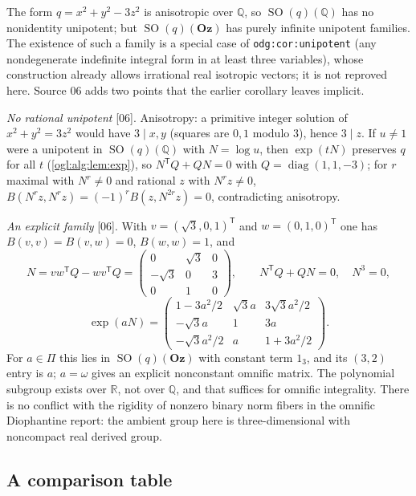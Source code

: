\documentclass[11pt,oneside]{article}
\numberwithin{equation}{section}
\theoremstyle{definition}
\theoremstyle{remark}
\newcommand{\Oz}{\mathbf{Oz}}
\newcommand{\Q}{\mathbb Q}
\newcommand{\R}{\mathbb R}
\newcommand{\SO}{\operatorname{SO}}
\newcommand{\diag}{\operatorname{diag}}
\newcommand{\src}[1]{\textup{\textsf{\small[#1]}}}
\newcommand{\replabel}[1]{\nolinkurl{#1}}
\begin{document}
The form $q=x^2+y^2-3z^2$ is anisotropic over $\Q$, so $\SO(q)(\Q)$ has no
nonidentity unipotent; but $\SO(q)(\Oz)$ has purely infinite unipotent
families. The existence of such a family is a special case of
\replabel{odg:cor:unipotent} (any nondegenerate indefinite integral form in at
least three variables), whose construction already allows irrational real
isotropic vectors; it is not reproved here. Source 06 adds two points that the
earlier corollary leaves implicit.

\emph{No rational unipotent} \src{06}. Anisotropy: a primitive integer solution
of $x^2+y^2=3z^2$ would have $3\mid x,y$ (squares are $0,1$ modulo $3$), hence
$3\mid z$. If $u\ne1$ were a unipotent in $\SO(q)(\Q)$ with $N=\log u$, then
$\exp(tN)$ preserves $q$ for all $t$ (\cref{ogl:alg:lem:exp}), so
$N^{\mathsf T}Q+QN=0$ with $Q=\diag(1,1,-3)$; for $r$ maximal with $N^r\ne0$ and
rational $z$ with $N^rz\ne0$, $B(N^rz,N^rz)=(-1)^rB(z,N^{2r}z)=0$, contradicting
anisotropy.

\emph{An explicit family} \src{06}. With $v=(\sqrt3,0,1)^{\mathsf T}$ and
$w=(0,1,0)^{\mathsf T}$ one has $B(v,v)=B(v,w)=0$, $B(w,w)=1$, and
\[
 N=vw^{\mathsf T}Q-wv^{\mathsf T}Q
 =\begin{pmatrix}0&\sqrt3&0\\-\sqrt3&0&3\\0&1&0\end{pmatrix},
 \qquad N^{\mathsf T}Q+QN=0,\quad N^3=0,
\]
\begin{equation}\label{ogl:alg:eq:realexample}
 \exp(aN)=
 \begin{pmatrix}
 1-3a^2/2&\sqrt3a&3\sqrt3a^2/2\\
 -\sqrt3a&1&3a\\
 -\sqrt3a^2/2&a&1+3a^2/2
 \end{pmatrix}.
\end{equation}
For $a\in\Pi$ this lies in $\SO(q)(\Oz)$ with constant term $1_3$, and its
$(3,2)$ entry is $a$; $a=\omega$ gives an explicit nonconstant omnific matrix.
The polynomial subgroup exists over $\R$, not over $\Q$, and that suffices for
omnific integrality. There is no conflict with the rigidity of nonzero binary
norm fibers in the omnific Diophantine report: the ambient group here is
three-dimensional with noncompact real derived group.

\subsection{A comparison table}
\end{document}
